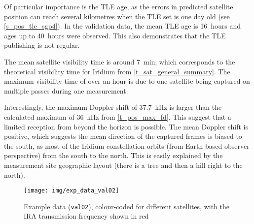Of particular importance is the TLE age, as the errors in predicted satellite position can reach several kilometres when the TLE set is one day old (see \autoref{s_pos_tle_sgp4}). In the validation data, the mean TLE age is \qty{16}{hours} and ages up to \qty{40}{hours} were observed. This also demonstrates that the TLE publishing is not regular.

The mean satellite visibility time is around \qty{7}{min}, which corresponds to the theoretical visibility time for Iridium from \autoref{t_sat_general_summary}. The maximum visibility time of over an hour is due to one satellite being captured on multiple passes during one measurement.

Interestingly, the maximum Doppler shift of \qty{37.7}{kHz} is larger than the calculated maximum of \qty{36}{kHz} from \autoref{t_pos_max_fd}. This suggest that a limited reception from beyond the horizon is possible. The mean Doppler shift is positive, which suggests the mean direction of the captured frames is biased to the south, as most of the Iridium constellation orbits (from Earth-based observer perspective) from the south to the north. This is easily explained by the measurement site geographic layout (there is a tree and then a hill right to the north).

\begin{figure}
    \centering
    \texttt{[image: img/exp\_data\_val02]}
    \caption[Example data]{Example data (\texttt{val02}), colour-coded for different satellites, with the IRA transmission frequency shown in red}
    \label{f_exp_data_val02}
\end{figure}

